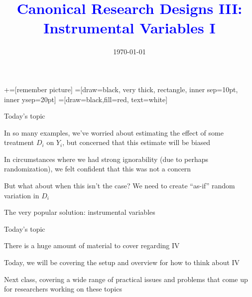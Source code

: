 \documentclass[notes,11pt, aspectratio=169]{beamer}
\title[]{\textcolor{blue}{Canonical Research Designs III:\\ Instrumental Variables I }}
\author[PGP]{}
\institute[FRBNY]{\small{\begin{tabular}{c}
  Paul Goldsmith-Pinkham  \\
\end{tabular}}}
\date{\today}
\newenvironment{wideitemize}{\itemize\addtolength{\itemsep}{10pt}}{\enditemize}
\begin{document}
\newcommand\marktopleft[1]{%
    \tikz[overlay,remember picture] 
        \node (marker-#1-a) at (-.3em,.3em) {};%
}
\newcommand\markbottomright[2]{%
    \tikz[overlay,remember picture] 
        \node (marker-#1-b) at (0em,0em) {};%
}
+=[remember picture] 
 =[draw=black, very thick, rectangle, inner sep=10pt, inner ysep=20pt]
 =[draw=black,fill=red, text=white]

\begin{frame}
\maketitle
\end{frame}


\begin{frame}{Today's topic}
  \begin{wideitemize}
  \item In so many examples, we've worried about estimating the effect
    of some treatment $D_{i}$ on $Y_{i}$, but concerned that this
    estimate will be biased
  \item In circumstances where we had strong ignorability (due to
    perhaps randomization), we felt confident that this was not a concern
  \item But what about when this isn't the case? We need to create
    ``as-if'' random variation in $D_{i}$
  \item The very popular solution: instrumental variables
  \end{wideitemize}
\end{frame}

\begin{frame}{Today's topic}
  \begin{wideitemize}
  \item There is a huge amount of material to cover regarding IV
  \item Today, we will be covering the setup and overview for how to think about IV
  \item Next class, covering a wide range of practical issues and
    problems that come up for researchers working on these topics
  \end{wideitemize}
\end{frame}
\end{document}
